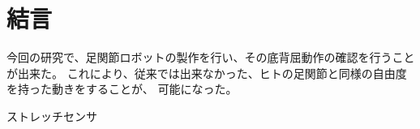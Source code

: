 \section{結言}
今回の研究で、足関節ロボットの製作を行い、その底背屈動作の確認を行うことが出来た。
これにより、従来では出来なかった、ヒトの足関節と同様の自由度を持った動きをすることが、
可能になった。

ストレッチセンサ